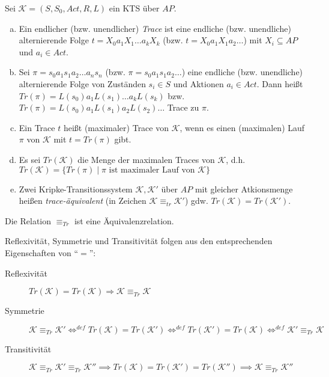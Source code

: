 \begin{defn}[Traces]
	Sei $\mathcal{K} = (S, S_0, \textit{Act}, R, L)$ ein KTS über $AP$.
	
	\begin{enumerate}[a)]
		\item Ein endlicher (bzw. unendlicher) \emph{Trace} ist eine endliche (bzw. unendliche) alternierende Folge $t=X_0 a_1 X_1 \dots a_k X_k$ (bzw. $t=X_0 a_1 X_1 a_2 \dots$) mit $X_i \subseteq \textit{AP}$ und $a_i \in \textit{Act}$.
		
		\item Sei  $\pi = s_0 a_1 s_1 a_2 \dots a_n s_n$ (bzw. $\pi = s_0 a_1 s_1 a_2 \dots $) eine endliche (bzw. unendliche) alternierende Folge von Zuständen $s_i \in S$ und Aktionen $a_i \in \textit{Act}$. Dann heißt $Tr(\pi) = L(s_0) a_1 L(s_1) \dots a_k L(s_k)$ bzw. $Tr(\pi) = L(s_0) a_1 L(s_1) a_2 L(s_2) \dots$ Trace zu $\pi$.
		
		\item Ein Trace $t$ heißt (maximaler) Trace von $\mathcal{K}$, wenn es einen (maximalen) Lauf $\pi$ von $\mathcal{K}$ mit $t=Tr(\pi)$ gibt.
		
		\item[] Es sei $Tr(\mathcal{K})$ die Menge der maximalen Traces von $\mathcal{K}$, d.h. $Tr(\mathcal{K}) = \{Tr(\pi) \mid \pi \text{ ist maximaler Lauf von } \mathcal{K}\}$
		
		\item Zwei Kripke-Transitionssystem $\mathcal{K}, \mathcal{K}'$ über $AP$ mit gleicher Atkionsmenge heißen \emph{trace-äquivalent} (in Zeichen $\mathcal{K} \equiv_{tr} \mathcal{K}'$) gdw. $Tr(\mathcal{K}) = Tr(\mathcal{K'})$.
	\end{enumerate}
\end{defn}

\begin{lemma}
	Die Relation $\equiv_{Tr}$ ist eine Äquivalenzrelation.
\end{lemma}

\begin{beweis}
	Reflexivität, Symmetrie und Transitivität folgen aus den entsprechenden Eigenschaften von \enquote{$=$}:
	
	\begin{description}
		\item[Reflexivität] $Tr(\mathcal{K}) = Tr(\mathcal{K}) \Rightarrow \mathcal{K} \equiv_{Tr} \mathcal{K}$
		\item[Symmetrie] $\mathcal{K} \equiv_{Tr} \mathcal{K'} \Leftrightarrow^{def} Tr(\mathcal{K}) = Tr(\mathcal{K'}) \Leftrightarrow^{def} Tr(\mathcal{K'}) = Tr(\mathcal{K}) \Leftrightarrow^{def} \mathcal{K'} \equiv_{Tr} \mathcal{K}$
		\item[Transitivität] $\mathcal{K} \equiv_{Tr} \mathcal{K'} \equiv_{Tr} \mathcal{K''} \implies Tr(\mathcal{K}) = Tr(\mathcal{K'}) = Tr(\mathcal{K''}) \implies \mathcal{K} \equiv_{Tr} \mathcal{K''}$
	\end{description}
\end{beweis}

